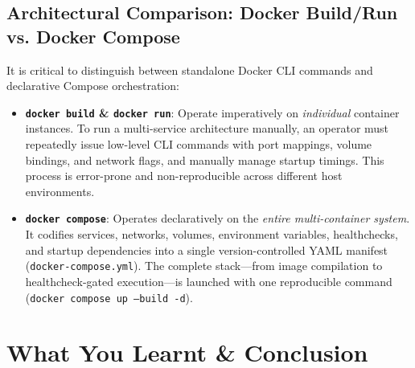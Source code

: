 \documentclass[11pt,a4paper]{article}
\begin{document}
\subsection{Architectural Comparison: Docker Build/Run vs. Docker Compose}
It is critical to distinguish between standalone Docker CLI commands and declarative Compose orchestration:
\begin{itemize}[itemsep=2pt, topsep=2pt]
    \item \textbf{\texttt{docker build} \& \texttt{docker run}}: Operate imperatively on \textit{individual} container instances. To run a multi-service architecture manually, an operator must repeatedly issue low-level CLI commands with port mappings, volume bindings, and network flags, and manually manage startup timings. This process is error-prone and non-reproducible across different host environments.
    \item \textbf{\texttt{docker compose}}: Operates declaratively on the \textit{entire multi-container system}. It codifies services, networks, volumes, environment variables, healthchecks, and startup dependencies into a single version-controlled YAML manifest (\texttt{docker-compose.yml}). The complete stack—from image compilation to healthcheck-gated execution—is launched with one reproducible command (\texttt{docker compose up --build -d}).
\end{itemize}

\section{What You Learnt \& Conclusion}
\end{document}
